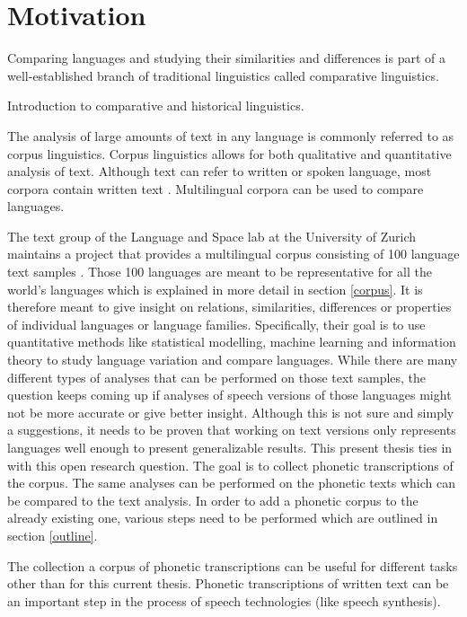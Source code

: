 
\label{chap:1_intro}
\section{Motivation}
Comparing languages and studying their similarities and differences is part of a well-established branch of traditional linguistics called comparative linguistics. 

Introduction to comparative and historical linguistics. \citep{Hock&Joseph.2019}

The analysis of large amounts of text in any language is commonly referred to as corpus linguistics. Corpus linguistics allows for both qualitative and quantitative analysis of text. Although text can refer to written or spoken language, most corpora contain written text \citep{McEnery&Hardie.2011}. Multilingual corpora can be used to compare languages.

The text group of the Language and Space lab at the University of Zurich maintains a project that provides a multilingual corpus consisting of 100 language text samples \citep{UniversityofZurich.19.07.2021}. Those 100 languages are meant to be representative for all the world's languages which is explained in more detail in section \ref{corpus}. It is therefore meant to give insight on relations, similarities, differences or properties of individual languages or language families. Specifically, their goal is to use quantitative methods like statistical modelling, machine learning and information theory to study language variation and compare languages. While there are many different types of analyses that can be performed on those text samples, the question keeps coming up if analyses of speech versions of those languages might not be more accurate or give better insight. Although this is not sure and simply a suggestions, it needs to be proven that working on text versions only represents languages well enough to present generalizable results. This present thesis ties in with this open research question. The goal is to collect phonetic transcriptions of the corpus. The same analyses can be performed on the phonetic texts which can be compared to the text analysis. In order to add a phonetic corpus to the already existing one, various steps need to be performed which are outlined in section \ref{outline}.

The collection a corpus of phonetic transcriptions can be useful for different tasks other than for this current thesis. Phonetic transcriptions of written text can be an important step in the process of speech technologies (like speech synthesis). 


